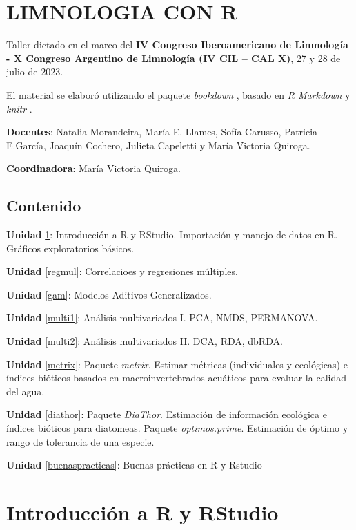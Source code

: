 \documentclass[
]{book}
\author{}
\date{\vspace{-2.5em}}
\begin{document}
{
\setcounter{tocdepth}{1}
\tableofcontents
}
\hypertarget{limnologia-con-r}{%
\chapter*{LIMNOLOGIA CON R}\label{limnologia-con-r}}

Taller dictado en el marco del \textbf{IV Congreso Iberoamericano de Limnología - X Congreso Argentino de Limnología (IV CIL -- CAL X)}, 27 y 28 de julio de 2023.

El material se elaboró utilizando el paquete \emph{bookdown} \citep{R-bookdown, bookdown2016}, basado en \emph{R Markdown} \citep{rmarkdown2020} y \emph{knitr} \citep{xie2015}.

\textbf{Docentes}: Natalia Morandeira, María E. Llames, Sofía Carusso, Patricia E.García, Joaquín Cochero, Julieta Capeletti y María Victoria Quiroga.

\textbf{Coordinadora}: María Victoria Quiroga.

\hypertarget{contenido}{%
\section{Contenido}\label{contenido}}

\textbf{Unidad} \ref{intro}: Introducción a R y RStudio. Importación y manejo de datos en R. Gráficos exploratorios básicos.

\textbf{Unidad} \ref{regmul}: Correlacioes y regresiones múltiples.

\textbf{Unidad} \ref{gam}: Modelos Aditivos Generalizados.

\textbf{Unidad} \ref{multi1}: Análisis multivariados I. PCA, NMDS, PERMANOVA.

\textbf{Unidad} \ref{multi2}: Análisis multivariados II. DCA, RDA, dbRDA.

\textbf{Unidad} \ref{metrix}: Paquete \emph{metrix}. Estimar métricas (individuales y ecológicas) e índices bióticos basados en macroinvertebrados acuáticos para evaluar la calidad del agua.

\textbf{Unidad} \ref{diathor}: Paquete \emph{DiaThor}. Estimación de información ecológica e índices bióticos para diatomeas. Paquete \emph{optimos.prime}. Estimación de óptimo y rango de tolerancia de una especie.

\textbf{Unidad} \ref{buenaspracticas}: Buenas prácticas en R y Rstudio

\hypertarget{intro}{%
\chapter{Introducción a R y RStudio}\label{intro}}
\end{document}
